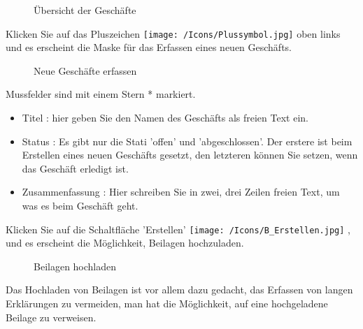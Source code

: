 
\begin{figure}[H]
\caption{Übersicht der Geschäfte}
\end{figure}

Klicken Sie auf das Pluszeichen \texttt{[image: /Icons/Plussymbol.jpg]}  oben links und es erscheint die Maske für das Erfassen eines neuen Geschäfts.

\begin{figure}[H]
\caption{Neue Geschäfte erfassen}
\end{figure}

Mussfelder sind mit einem Stern * markiert.

\begin{itemize}
\item
Titel : hier geben Sie den Namen des Geschäfts als freien Text ein.
\item 
Status : Es gibt nur die Stati 'offen' und 'abgeschlossen'. Der erstere ist beim Erstellen eines neuen Geschäfts gesetzt, den letzteren können Sie setzen, wenn das Geschäft erledigt ist.
\item
Zusammenfassung : Hier schreiben Sie in zwei, drei Zeilen freien Text, um was es beim Geschäft geht.
\end{itemize}

Klicken Sie auf die Schaltfläche 'Erstellen' \texttt{[image: /Icons/B\_Erstellen.jpg]} , und es erscheint die Möglichkeit, Beilagen hochzuladen.

\begin{figure}[H]
\caption{Beilagen hochladen}
\end{figure}

Das Hochladen von Beilagen ist vor allem dazu gedacht, das Erfassen von langen Erklärungen zu vermeiden, man hat die Möglichkeit, auf eine hochgeladene Beilage zu verweisen.

